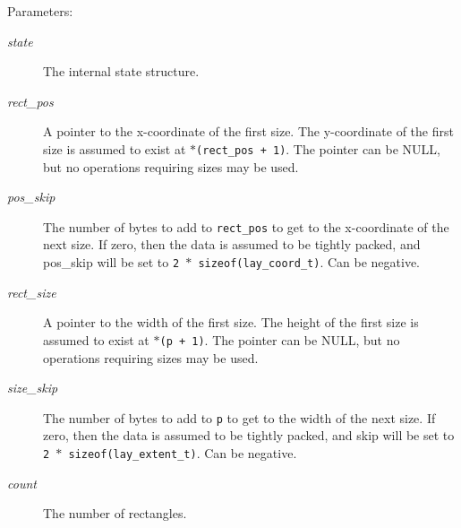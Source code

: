 \begin{Desc}
\item[Parameters:]
\begin{description}
\item[{\em state}]The internal state structure. \item[{\em rect\_\-pos}]A pointer to the x-coordinate of the first size. The y-coordinate of the first size is assumed to exist at {\tt $\ast$(rect\_\-pos + 1)}. The pointer can be NULL, but no operations requiring sizes may be used. \item[{\em pos\_\-skip}]The number of bytes to add to {\tt rect\_\-pos} to get to the x-coordinate of the next size. If zero, then the data is assumed to be tightly packed, and pos\_\-skip will be set to {\tt 2 $\ast$ sizeof(lay\_\-coord\_\-t)}. Can be negative. \item[{\em rect\_\-size}]A pointer to the width of the first size. The height of the first size is assumed to exist at {\tt $\ast$(p + 1)}. The pointer can be NULL, but no operations requiring sizes may be used. \item[{\em size\_\-skip}]The number of bytes to add to {\tt p} to get to the width of the next size. If zero, then the data is assumed to be tightly packed, and skip will be set to {\tt 2 $\ast$ sizeof(lay\_\-extent\_\-t)}. Can be negative. \item[{\em count}]The number of rectangles. \end{description}
\end{Desc}
